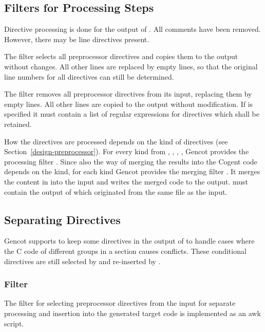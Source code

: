 \subsection{Filters for Processing Steps}

Directive processing is done for the output of . All comments have been removed. 
However, there may be line directives present. 

The filter  selects all preprocessor directives and
copies them to the output without changes. All other lines are replaced by empty lines, so that the original
line numbers for all directives can still be determined.

The filter  removes all preprocessor directives from its input, replacing them by empty
lines. All other lines are copied to the output without modification. If  is specified it must 
contain a list of regular expressions for directives which shall be retained.

How the directives are processed depends on the kind of directives (see Section~\ref{design-preprocessor}).
For every kind  from , , , , Gencot provides the processing
filter . Since also the way of merging the results into the Cogent code depends on the
kind, for each kind Gencot provides the merging filter . It merges the content in  
into the input and writes the merged code to the output.  must contain the output of 
which originated from the same file as the input.

\subsection{Separating Directives}

Gencot supports to keep some directives in the output of  to handle cases where
the C code of different groups in a section causes conflicts. These conditional directives are still selected
by  and re-inserted by . 

\subsubsection{Filter }

The filter for selecting preprocessor directives from the input for separate processing and insertion into
the generated target code is implemented as an awk script.

